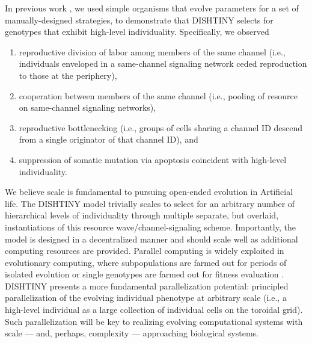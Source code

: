 In previous work \cite{moreno2018toward}, we used simple organisms that evolve parameters for a set of manually-designed strategies, to demonstrate that DISHTINY selects for genotypes that exhibit high-level individuality.
Specifically, we observed
\begin{enumerate}
  \item reproductive division of labor among members of the same channel (i.e., individuals enveloped in a same-channel signaling network ceded reproduction to those at the periphery),
  \item cooperation between members of the same channel (i.e., pooling of resource on same-channel signaling networks),
  \item reproductive bottlenecking (i.e., groups of cells sharing a channel ID descend from a single originator of that channel ID), and
  \item suppression of somatic mutation via apoptosis coincident with high-level individuality.
\end{enumerate}

We believe scale is fundamental to pursuing open-ended evolution in Artificial life.
The DISHTINY model trivially scales to select for an arbitrary number of hierarchical levels of individuality through multiple separate, but overlaid, instantiations of this resource wave/channel-signaling scheme.
Importantly, the model is designed in a decentralized manner and should scale well as additional computing resources are provided.
Parallel computing is widely exploited in evolutionary computing, where subpopulations are farmed out for periods of isolated evolution or single genotypes are farmed out for fitness evaluation
\cite{lin1994coarse, real17a}.
DISHTINY presents a more fundamental parallelization potential: principled parallelization of the evolving individual phenotype at arbitrary scale (i.e., a high-level individual as a large collection of individual cells on the toroidal grid).
Such parallelization will be key to realizing evolving computational systems with scale --- and, perhaps, complexity --- approaching biological systems.
